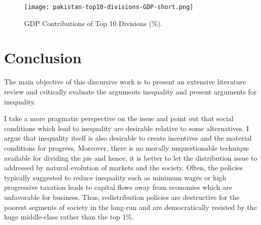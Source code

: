 \documentclass[12pt]{article}
\newcommand{\1}{\mathbbm 1}
\begin{document}
		
		 
		
		
		
		
		
		
		
		
		
		
		
		
		
	
		
	\begin{figure}[H] 
			\texttt{[image: pakistan-top10-divisions-GDP-short.png]}%
		\caption{GDP Contributions of Top 10 Divisions (\%).}
	\end{figure}
		
		
		
		
		
		
		
		
		
		
		
		
		
		
		
		
		
	
			
			
			
	
	 
		
		
	
		\section{Conclusion}
		
		
		The main objective of this discursive work is to present an extensive literature review and critically evaluate the arguments inequality and present arguments for inequality.
		
		 I take a more pragmatic perspective on the issue and point out that social conditions which lead to inequality are desirable relative to some alternatives. I argue that inequality itself is also desirable to create incentives and the material conditions for progress. Moreover, there is no morally unquestionable technique available for dividing the pie and hence, it is better to let the distribution issue to addressed by natural evolution of markets and the society. Often, the policies typically suggested to reduce inequality such as minimum wages or high progressive taxation leads to capital flows away from economies which are unfavorable for business. Thus, redistribution policies are destructive for the poorest segments of society in the long-run and are democratically resisted by the huge middle-class rather than the top 1\%. 
		
\end{document}
